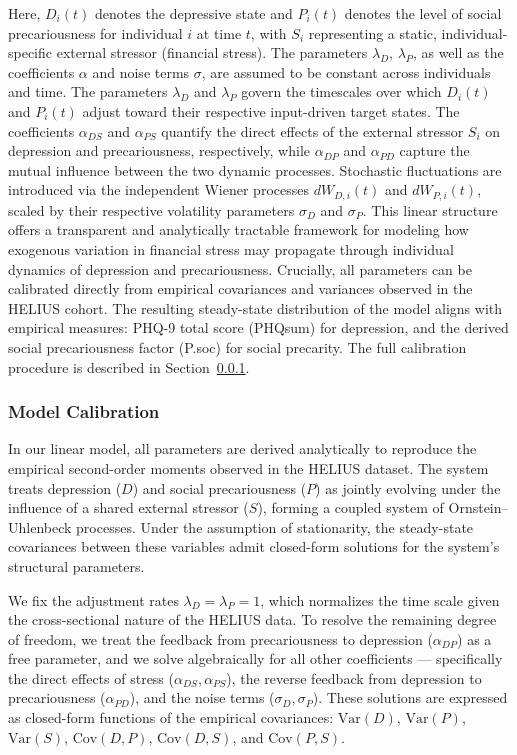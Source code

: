 \documentclass[
]{article}
\begin{document}
Here, \(D_i(t)\) denotes the depressive state and \(P_i(t)\) denotes the
level of social precariousness for individual \(i\) at time \(t\), with
\(S_i\) representing a static, individual-specific external stressor
(financial stress). The parameters \(\lambda_D\), \(\lambda_P\), as well
as the coefficients \(\alpha\) and noise terms \(\sigma\), are assumed
to be constant across individuals and time. The parameters \(\lambda_D\)
and \(\lambda_P\) govern the timescales over which \(D_i(t)\) and
\(P_i(t)\) adjust toward their respective input-driven target states.
The coefficients \(\alpha_{DS}\) and \(\alpha_{PS}\) quantify the direct
effects of the external stressor \(S_i\) on depression and
precariousness, respectively, while \(\alpha_{DP}\) and \(\alpha_{PD}\)
capture the mutual influence between the two dynamic processes.
Stochastic fluctuations are introduced via the independent Wiener
processes \(dW_{D,i}(t)\) and \(dW_{P,i}(t)\), scaled by their
respective volatility parameters \(\sigma_D\) and \(\sigma_P\). This
linear structure offers a transparent and analytically tractable
framework for modeling how exogenous variation in financial stress may
propagate through individual dynamics of depression and precariousness.
Crucially, all parameters can be calibrated directly from empirical
covariances and variances observed in the HELIUS cohort. The resulting
steady-state distribution of the model aligns with empirical measures:
PHQ-9 total score (PHQsum) for depression, and the derived social
precariousness factor (P.soc) for social precarity. The full calibration
procedure is described in Section~\ref{sec-calibration}.

\subsubsection{Model Calibration}\label{sec-calibration}

In our linear model, all parameters are derived analytically to
reproduce the empirical second-order moments observed in the HELIUS
dataset. The system treats depression (\(D\)) and social precariousness
(\(P\)) as jointly evolving under the influence of a shared external
stressor (\(S\)), forming a coupled system of Ornstein--Uhlenbeck
processes. Under the assumption of stationarity, the steady-state
covariances between these variables admit closed-form solutions for the
system's structural parameters.

We fix the adjustment rates \(\lambda_D = \lambda_P = 1\), which
normalizes the time scale given the cross-sectional nature of the HELIUS
data. To resolve the remaining degree of freedom, we treat the feedback
from precariousness to depression (\(\alpha_{DP}\)) as a free parameter,
and we solve algebraically for all other coefficients --- specifically
the direct effects of stress (\(\alpha_{DS}, \alpha_{PS}\)), the reverse
feedback from depression to precariousness (\(\alpha_{PD}\)), and the
noise terms (\(\sigma_D, \sigma_P\)). These solutions are expressed as
closed-form functions of the empirical covariances: \(\mathrm{Var}(D)\),
\(\mathrm{Var}(P)\), \(\mathrm{Var}(S)\), \(\mathrm{Cov}(D, P)\),
\(\mathrm{Cov}(D, S)\), and \(\mathrm{Cov}(P, S)\).
\end{document}

